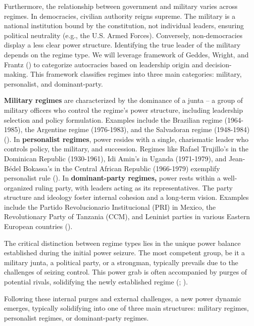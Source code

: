 \documentclass[
  12pt,
]{report}
\begin{document}
Furthermore, the relationship between government and military varies
across regimes. In democracies, civilian authority reigns supreme. The
military is a national institution bound by the constitution, not
individual leaders, ensuring political neutrality (e.g., the U.S. Armed
Forces). Conversely, non-democracies display a less clear power
structure. Identifying the true leader of the military depends on the
regime type. We will leverage framework of Geddes, Wright, and Frantz
() to categorize autocracies based on
leadership origin and decision-making. This framework classifies regimes
into three main categories: military, personalist, and dominant-party.

\textbf{Military regimes} are characterized by the dominance of a junta
-- a group of military officers who control the regime's power
structure, including leadership selection and policy formulation.
Examples include the Brazilian regime (1964-1985), the Argentine regime
(1976-1983), and the Salvadoran regime (1948-1984)
(). In \textbf{personalist
regimes}, power resides with a single, charismatic leader who controls
policy, the military, and succession. Regimes like Rafael Trujillo's in
the Dominican Republic (1930-1961), Idi Amin's in Uganda (1971-1979),
and Jean-Bédel Bokassa's in the Central African Republic (1966-1979)
exemplify personalist rule (). In
\textbf{dominant-party regimes,} power rests within a well-organized
ruling party, with leaders acting as its representatives. The party
structure and ideology foster internal cohesion and a long-term vision.
Examples include the Partido Revolucionario Institucional (PRI) in
Mexico, the Revolutionary Party of Tanzania (CCM), and Leninist parties
in various Eastern European countries ().

The critical distinction between regime types lies in the unique power
balance established during the initial power seizure. The most competent
group, be it a military junta, a political party, or a strongman,
typically prevails due to the challenges of seizing control. This power
grab is often accompanied by purges of potential rivals, solidifying the
newly established regime (;
).

Following these internal purges and external challenges, a new power
dynamic emerges, typically solidifying into one of three main
structures: military regimes, personalist regimes, or dominant-party
regimes.
\end{document}
